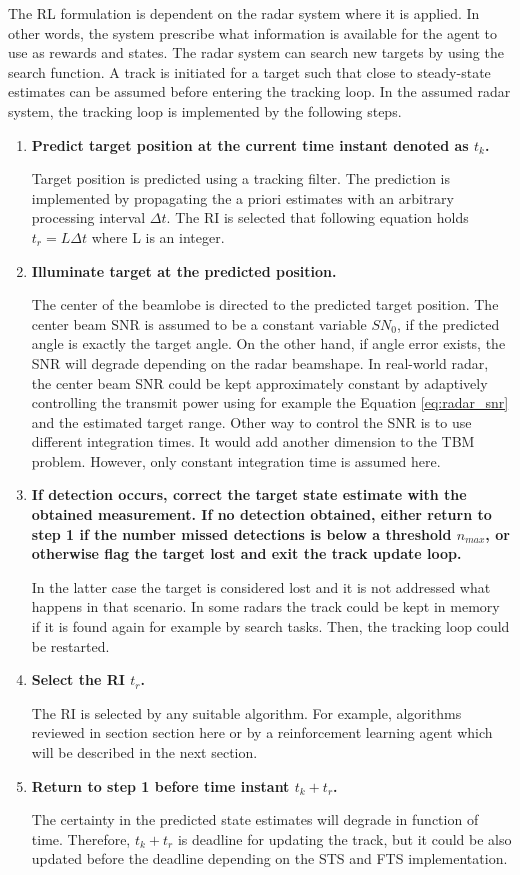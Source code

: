 \documentclass[english, 12pt, a4paper, elec, utf8, a-1b, online]{aaltothesis}
\newcommand{\dt}{\Delta t}
\begin{document}
The RL formulation is dependent on the radar system where it is applied. 
In other words, the system prescribe what information is available for the agent to use as rewards and states. 
The radar system can search new targets by using the search function. 
A track is initiated for a target such that close to steady-state estimates can be assumed before entering the tracking loop. 
In the assumed radar system, the tracking loop is implemented by the following steps.
\begin{enumerate}
\item\textbf{Predict target position at the current time instant denoted as $t_k$.}


Target position is predicted using a tracking filter. The prediction is implemented by propagating the a priori estimates with an arbitrary processing interval $\dt$. The RI is selected that following equation holds $ t_r  =L \dt$ where L is an integer.

\item\textbf{Illuminate target at the predicted position.}

The center of the beamlobe is directed to the predicted target position. 
The center beam SNR is assumed to be a constant variable $SN_0$, if the predicted angle is exactly the target angle. 
On the other hand, if angle error exists, the SNR will degrade depending on the radar beamshape. 
In real-world radar, the center beam SNR could be kept approximately constant by adaptively controlling the transmit power using for example the Equation \eqref{eq:radar_snr} and the estimated target range. 
Other way to control the SNR is to use different integration times. 
It would add another dimension to the TBM problem. 
However, only constant integration time is assumed here.

\item\textbf{If detection occurs, correct the target state estimate with the obtained measurement. If no detection obtained, either return to step 1 if the number missed detections is below a threshold $n_{max}$, or otherwise flag the target lost and exit the track update loop.}

In the latter case the target is considered lost and it is not addressed what happens in that scenario. In some radars the track could be kept in memory if it is found again for example by search tasks. Then, the tracking loop could be restarted.


\item\textbf{Select the RI $t_r$.}

The RI is selected by any suitable algorithm. For example, algorithms reviewed in section section here or by a reinforcement learning agent which will be described in the next section. 


\item\textbf{Return to step 1 before time instant $t_k + t_r$.}

The certainty in the predicted state estimates will degrade in function of time. Therefore, $t_k + t_r$ is deadline for updating the track, but it could be also updated before the deadline depending on the STS and FTS implementation.

\end{enumerate}
\end{document}
